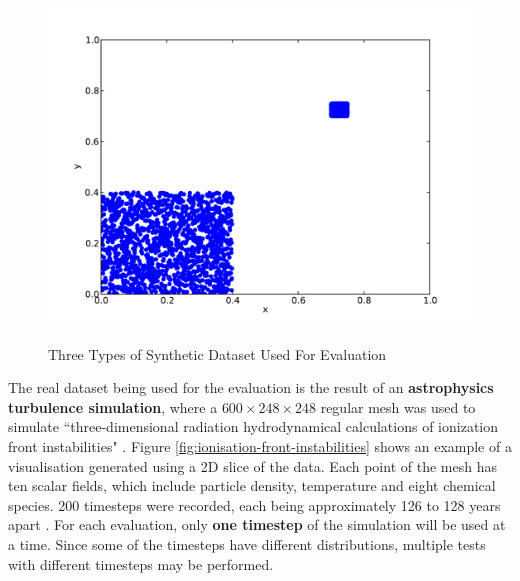 \begin{figure}
\begin{center}
			\begin{subfloat} {%
				\includegraphics[scale=0.25]{figures/clustered_distribution.pdf}
			}
			\end{subfloat}			  
		\end{center}

		\caption{Three Types of Synthetic Dataset Used For Evaluation}
		\label{fig:synthetic-data}
\end{figure}

The real dataset being used for the evaluation is the result of an \textbf{astrophysics turbulence simulation}, where a $600 \times 248 \times 248$ regular mesh was used to simulate ``three-dimensional radiation hydrodynamical calculations of ionization front instabilities" \cite{astrophysics-dataset}. Figure \ref{fig:ionisation-front-instabilities} shows an example of a visualisation generated using a 2D slice of the data. Each point of the mesh has ten scalar fields, which include particle density, temperature and eight chemical species. 200 timesteps were recorded, each being approximately 126 to 128 years apart \cite{astrophysics-dataset}. For each evaluation, only \textbf{one timestep} of the simulation will be used at a time. Since some of the timesteps have different distributions, multiple tests with different timesteps may be performed.

